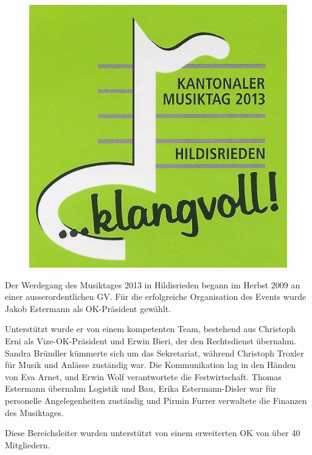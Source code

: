 \begin{history}

    \begin{figure}
        \includegraphics[width=\linewidth]{./chap/2001-2024/2013/Musiktag-Logo.jpg}
    \end{figure}

    Der Werdegang des Musiktages 2013 in Hildisrieden begann im Herbst 2009 an
    einer ausserordentlichen GV. Für die erfolgreiche Organisation des Events
    wurde Jakob Estermann als OK-Präsident gewählt.

    Unterstützt wurde er von einem kompetenten Team, bestehend aus Christoph
    Erni als Vize-OK-Präsident und Erwin Bieri, der den Rechtsdienst übernahm.
    Sandra Bründler kümmerte sich um das Sekretariat, während Christoph Troxler
    für Musik und Anlässe zuständig war. Die Kommunikation lag in den Händen von
    Eva Arnet, und Erwin Wolf verantwortete die Festwirtschaft. Thomas Estermann
    übernahm Logistik und Bau, Erika Estermann-Disler war für personelle
    Angelegenheiten zuständig und Pirmin Furrer verwaltete die Finanzen des
    Musiktages.

    Diese Bereichsleiter wurden unterstützt von einem erweiterten OK von über 40
    Mitgliedern.


\end{history}
